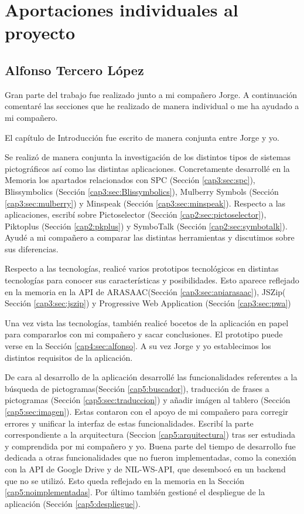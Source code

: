 \chapter{Aportaciones individuales al proyecto}
\label{cap:Aportacionesindividuales}

\section{Alfonso Tercero López}

Gran parte del trabajo fue realizado junto a mi compañero Jorge. A continuación comentaré las secciones que he realizado de manera individual o me ha ayudado a mi compañero.

El capítulo de Introducción fue escrito de manera conjunta entre Jorge y yo. 

Se realizó de manera conjunta la investigación de los distintos tipos de sistemas pictográficos así como las distintas aplicaciones. Concretamente desarrollé en la Memoria los apartados relacionados con SPC (Sección \ref{cap3:sec:spc}), Blissymbolics (Sección \ref{cap3:sec:Blissymbolics}), Mulberry Symbols (Sección \ref{cap3:sec:mulberry}) y Minspeak (Sección \ref{cap3:sec:minspeak}). Respecto a las aplicaciones, escribí sobre Pictoselector (Sección \ref{cap2:sec:pictoselector}), Piktoplus (Sección \ref{cap2:pkplus}) y SymboTalk (Sección \ref{cap2:sec:symbotalk}). Ayudé a mi compañero a comparar las distintas herramientas y discutimos sobre sus diferencias.

Respecto a las tecnologías, realicé varios prototipos tecnológicos en distintas tecnologías para conocer sus características y posibilidades. Esto aparece reflejado en la memoria en la API de ARASAAC(Sección \ref{cap3:sec:apiarasaac}), JSZip( Sección \ref{cap3:sec:jszip}) y Progressive Web Application (Sección \ref{cap3:sec:pwa})

Una vez vista las tecnologías, también realicé bocetos de la aplicación en papel para compararlos con mi compañero y sacar conclusiones. El prototipo puede verse en la Sección \ref{cap4:sec:alfonso}. A su vez Jorge y yo establecimos los distintos requisitos de la aplicación. 

De cara al desarrollo de la aplicación desarrollé las funcionalidades referentes a la búsqueda de pictogramas(Sección \ref{cap5:buscador}), traducción de frases a pictogramas (Sección \ref{cap5:sec:traduccion}) y añadir imágen al tablero (Sección \ref{cap5:sec:imagen}). Estas contaron con el apoyo de mi compañero para corregir errores y unificar la interfaz de estas funcionalidades. Escribí la parte correspondiente a la arquitectura (Seccion \ref{cap5:arquitectura}) tras ser estudiada y comprendida por mi compañero y yo. Buena parte del tiempo de desarrollo fue dedicada a otras funcionalidades que no fueron implementadas, como la conexión con la API de Google Drive y  de NIL-WS-API, que desembocó en un backend que no se utilizó. Esto queda reflejado en la memoria en la Sección \ref{cap5:noimplementadas}. Por último también gestioné el despliegue de la aplicación (Sección \ref{cap5:despliegue}). 

